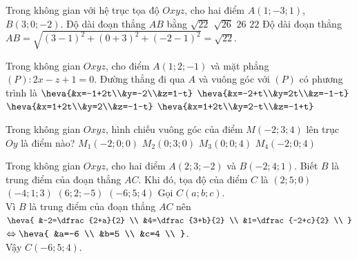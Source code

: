 \begin{vd}%
    Trong không gian với hệ trục tọa độ $Oxyz$, cho hai điểm $A(1;-3;1)$, $B(3;0;-2)$. Độ dài đoạn thẳng $AB$ bằng
    \choice
    {\True $\sqrt{22}$}
    {$\sqrt{26}$}
    {$26$}
    {$22$}
    \loigiai
    {
        Độ dài đoạn thẳng $AB=\sqrt{(3-1)^2+(0+3)^2+(-2-1)^2}=\sqrt{22}$.	
    }
\end{vd}
\begin{vd}[TN2024-102]%
    Trong không gian $Oxyz$, cho điểm $A(1;2;-1)$ và mặt phẳng $(P)\colon 2x-z+1=0$. Đường thẳng đi qua $A$ và vuông góc với $(P)$ có phương trình là
    \choice
    {$\heva{&x=-1+2t\\&y=-2\\&z=1-t}$}
    {$\heva{&x=-2+t\\&y=2t\\&z=-1-t}$}
    {\True $\heva{&x=1+2t\\&y=2\\&z=-1-t}$}
    {$\heva{&x=1+2t\\&y=2-t\\&z=-1+t}$}
\end{vd}
\begin{vd}%
    Trong không gian $Oxyz$, hình chiếu vuông góc của điểm $M(-2;3;4)$ lên trục $Oy$ là điểm nào?
    \choice
    {$M_1(-2;0;0)$}
    {\True $M_2(0;3;0)$}
    {$M_3(0;0;4)$}
    {$M_4(-2;0;4)$}
\end{vd}
\begin{vd}%
    Trong không gian $Oxyz$, cho hai điểm $A (2; 3 ; -2 )$ và $B (-2; 4; 1 )$. Biết $B$ là trung điểm của đoạn thẳng $AC$. Khi đó, tọa độ của điểm $C$ là
    \choice
    {$ (2; 5; 0 )$}
    {$ (-4; 1; 3 )$}
    {$ (6; 2; -5 )$}
    {\True $ (-6; 5; 4 )$}
    \loigiai
    {
        Gọi $C (a; b; c )$. \\
        Vì $B$ là trung điểm của đoạn thẳng $AC$ nên
        $\heva{
            &-2=\dfrac{2+a}{2}  \\
            &4=\dfrac{3+b}{2}  \\
            &1=\dfrac{-2+c}{2}  \\
        }$
        $\Leftrightarrow 
        \heva{
            &a=-6  \\
            &b=5  \\
            &c=4  \\
        }$.\\
        Vậy $C (-6; 5; 4 )$.
    }
\end{vd}
